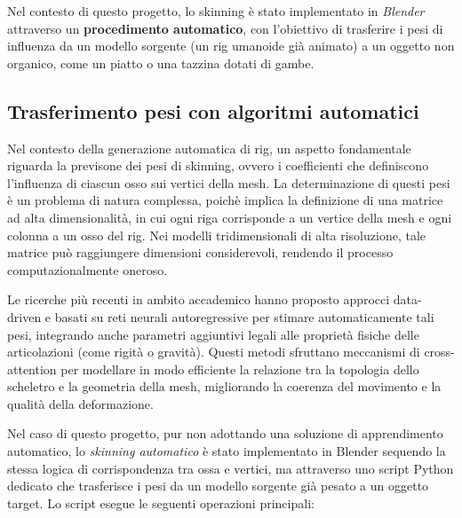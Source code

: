 Nel contesto di questo progetto, lo skinning è stato implementato in \textit{Blender} attraverso un \textbf{procedimento automatico}, con l'obiettivo di trasferire i pesi di influenza da un modello sorgente (un rig umanoide già animato) a un oggetto non organico, come un piatto o una tazzina dotati di gambe.

\subsection{Trasferimento pesi con algoritmi automatici}

Nel contesto della generazione automatica di rig, un aspetto fondamentale riguarda la previsone dei pesi di skinning, ovvero i coefficienti che definiscono l'influenza di ciascun osso sui vertici della mesh.
La determinazione di questi pesi è un problema di natura complessa, poichè implica la definizione di una matrice ad alta dimensionalità, in cui ogni riga corrisponde a un vertice della mesh e ogni colonna a un osso del rig. Nei modelli tridimensionali di alta risoluzione, tale matrice può raggiungere dimensioni considerevoli, rendendo il processo computazionalmente oneroso.

Le ricerche più recenti in ambito accademico hanno proposto approcci data-driven e basati su reti neurali autoregressive per stimare automaticamente tali pesi, integrando anche parametri aggiuntivi legali alle proprietà fisiche delle articolazioni (come rigità o gravità).
Questi metodi sfruttano meccanismi di cross-attention per modellare in modo efficiente la relazione tra la topologia dello scheletro e la geometria della mesh, migliorando la coerenza del movimento e la qualità della deformazione.

Nel caso di questo progetto, pur non adottando una soluzione di apprendimento automatico, lo \textit{skinning automatico} è stato implementato in Blender sequendo la stessa logica di corrispondenza tra ossa e vertici, ma attraverso uno script Python dedicato che trasferisce i pesi da un modello sorgente già pesato a un oggetto target.
Lo script esegue le seguenti operazioni principali:

